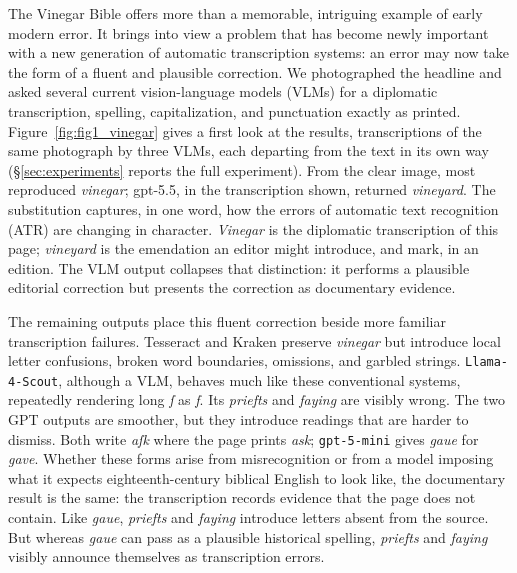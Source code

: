 \documentclass{anthology-ch}         %
\begin{document}
The Vinegar Bible offers more than a memorable, intriguing example of early modern error. It brings into view a problem that has become newly important with a new generation of automatic transcription systems: an error may now take the form of a fluent and plausible correction. We photographed the headline and asked several current vision-language models (VLMs) for a diplomatic transcription, spelling, capitalization, and punctuation exactly as printed. Figure~\ref{fig:fig1_vinegar} gives a first look at the results, transcriptions of the same photograph by three VLMs, each departing from the text in its own way (\S\ref{sec:experiments} reports the full experiment). From the clear image, most reproduced \emph{vinegar}; gpt-5.5, in the transcription shown, returned \emph{vineyard}. The substitution captures, in one word, how the errors of automatic text recognition (ATR) are changing in character. \emph{Vinegar} is the diplomatic transcription of this page; \emph{vineyard} is the emendation an editor might introduce, and mark, in an edition. The VLM output collapses that distinction: it performs a plausible editorial correction but presents the correction as documentary evidence.

The remaining outputs place this fluent correction beside more familiar transcription failures. Tesseract and Kraken preserve \emph{vinegar} but introduce local letter confusions, broken word boundaries, omissions, and garbled strings. \texttt{Llama-4-Scout}, although a VLM, behaves much like these conventional systems, repeatedly rendering long \emph{ſ} as \emph{f}. Its \emph{priefts} and \emph{faying} are visibly wrong. The two GPT outputs are smoother, but they introduce readings that are harder to
dismiss. Both write \emph{aſk} where the page prints \emph{ask}; \texttt{gpt-5-mini} gives \emph{gaue} for \emph{gave}. Whether these forms arise from misrecognition or from a model imposing what it expects eighteenth-century biblical English to look like, the documentary result is the same: the transcription records evidence that the page does not contain. Like \emph{gaue}, \emph{priefts} and \emph{faying} introduce letters absent from the source. But whereas \emph{gaue} can pass as a plausible historical spelling, \emph{priefts} and \emph{faying} visibly announce themselves as transcription errors.
\end{document}
